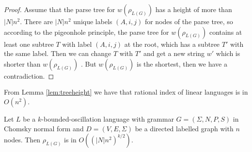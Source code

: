 \begin{proof}
 Assume that the parse tree for $w(\rho_{L(G)})$ has a height of more than $|N|n^2$. There are $|N|n^2$ unique labels $(A, i, j)$ for nodes of the parse tree, so according to the pigeonhole principle, the parse tree for $w(\rho_{L(G)})$ contains at least one subtree $T$ with label $(A, i, j)$ at the root, which has a subtree $T'$ with the same label. Then we can change $T$ with $T'$ and get a new string $w'$ which is shorter than $w(\rho_{L(G)})$ . But $w(\rho_{L(G)})$ is the shortest, then we have a contradiction.

\end{proof}
From Lemma \ref{lem:treeheight} we have that rational index of linear languages is in $O(n^2)$. 
\begin{theorem}
\label{oscbnddim}
Let $L$ be a $k$-bounded-oscillation language with grammar $G = (\Sigma, N, P, S)$ in Chomsky normal form and $D=(V, E, \Sigma)$ be a directed labelled graph with $n$ nodes. Then $\rho_{L(G)}$ is in $O((|N|n^2)^{k/2})$.
\end{theorem}
